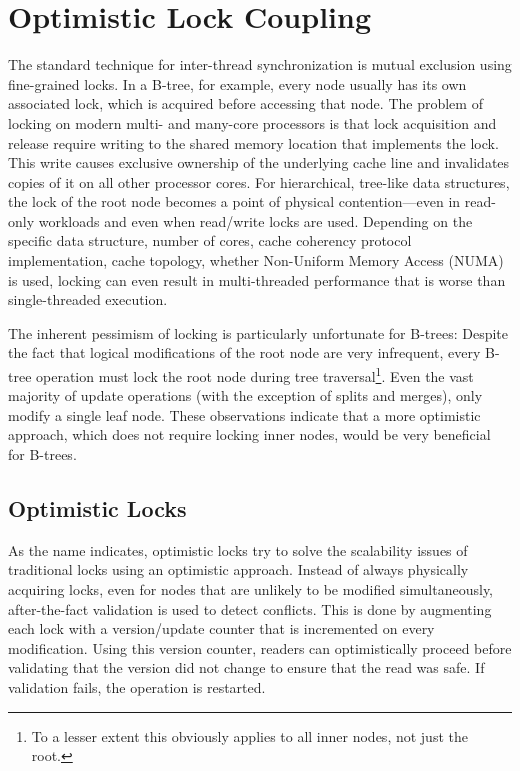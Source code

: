 \documentclass[11pt]{article}
\begin{document}

\section{Optimistic Lock Coupling}\label{sec:olc}

The standard technique for inter-thread synchronization is mutual exclusion using fine-grained locks.
In a B-tree, for example, every node usually has its own associated lock, which is acquired before accessing that node.
The problem of locking on modern multi- and many-core processors is that lock acquisition and release require writing to the shared memory location that implements the lock.
This write causes exclusive ownership of the underlying cache line and invalidates copies of it on all other processor cores.
For hierarchical, tree-like data structures, the lock of the root node becomes a point of physical contention---even in read-only workloads and even when read/write locks are used.
Depending on the specific data structure, number of cores, cache coherency protocol implementation, cache topology, whether Non-Uniform Memory Access (NUMA) is used, locking can even result in multi-threaded performance that is worse than single-threaded execution.

The inherent pessimism of locking is particularly unfortunate for B-trees:
Despite the fact that logical modifications of the root node are very infrequent, every B-tree operation must lock the root node during tree traversal\footnote{To a lesser extent this obviously applies to all inner nodes, not just the root.}.
Even the vast majority of update operations (with the exception of splits and merges), only modify a single leaf node.
These observations indicate that a more optimistic approach, which does not require locking inner nodes, would be very beneficial for B-trees.

\subsection{Optimistic Locks}

As the name indicates, optimistic locks try to solve the scalability issues of traditional locks using an optimistic approach.
Instead of always physically acquiring locks, even for nodes that are unlikely to be modified simultaneously, after-the-fact validation is used to detect conflicts.
This is done by augmenting each lock with a version/update counter that is incremented on every modification.
Using this version counter, readers can optimistically proceed before validating that the version did not change to ensure that the read was safe.
If validation fails, the operation is restarted.
\end{document}
